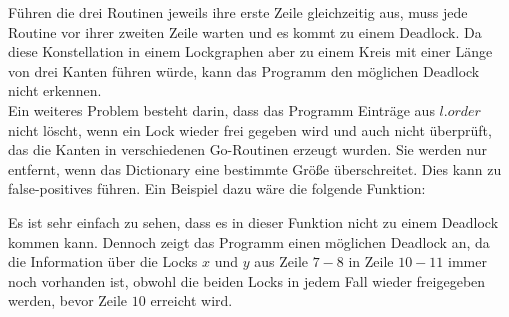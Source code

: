 Führen die drei Routinen jeweils ihre erste Zeile gleichzeitig aus, muss jede 
Routine vor ihrer zweiten Zeile warten und es kommt zu einem Deadlock. Da diese
Konstellation in einem Lockgraphen aber zu einem Kreis mit einer Länge von drei 
Kanten führen würde, kann das Programm den möglichen Deadlock nicht erkennen.\\
Ein weiteres Problem besteht darin, dass das Programm Einträge aus $l.order$ nicht 
löscht, wenn ein Lock wieder frei gegeben wird und auch nicht überprüft, das die 
Kanten in verschiedenen Go-Routinen erzeugt wurden. Sie werden nur entfernt, wenn 
das Dictionary eine bestimmte Größe überschreitet. Dies kann zu false-positives
führen. Ein Beispiel dazu wäre die folgende Funktion:  
\begin{figure}[H]
    
\end{figure}
Es ist sehr einfach zu sehen, dass es in dieser Funktion nicht zu einem Deadlock 
kommen kann. Dennoch zeigt das Programm einen möglichen Deadlock an, da die 
Information über die Locks $x$ und $y$ aus Zeile $7-8$ in Zeile $10-11$ immer 
noch vorhanden ist, obwohl die beiden Locks in jedem Fall wieder freigegeben
werden, bevor Zeile $10$ erreicht wird.



